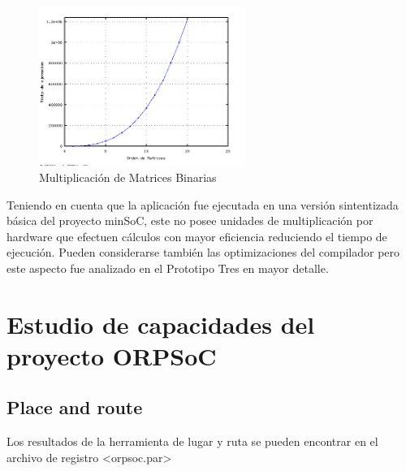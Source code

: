\begin{figure}[h!]
 	\begin{center}
  	\includegraphics[width=0.6\textwidth,keepaspectratio=true]{./images/matrices}
  	\caption{Multiplicación de Matrices Binarias}
  	\label{fig:mulmat}
 	\end{center}
	\end{figure}

		Teniendo en cuenta que la aplicación fue ejecutada en una versión sintentizada básica del proyecto minSoC, este no posee unidades de multiplicación
		por hardware que efectuen cálculos con mayor eficiencia reduciendo el tiempo de ejecución. Pueden considerarse también las optimizaciones del
		compilador pero este aspecto fue analizado en el Prototipo Tres en mayor detalle. 
		
\newpage
	\section{Estudio de capacidades del proyecto ORPSoC}

		\subsection{Place and route}	
Los resultados de la herramienta de lugar y ruta se pueden encontrar en el archivo de registro <orpsoc.par>

